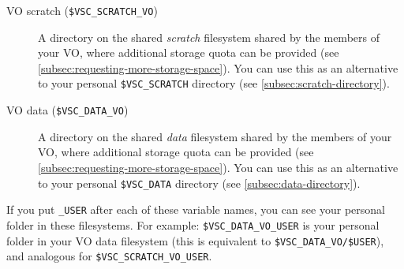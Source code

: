 \begin{description}
    \item[VO scratch (\texttt{\$VSC\_SCRATCH\_VO})]
        A directory on the shared \emph{scratch} filesystem shared by the members of your
        VO, where additional storage quota can be provided (see \autoref{subsec:requesting-more-storage-space}).
        You can use this as an alternative to your personal \lstinline|$VSC_SCRATCH|
        directory (see \autoref{subsec:scratch-directory}).

    \item[VO data (\texttt{\$VSC\_DATA\_VO})]
        A directory on the shared \emph{data} filesystem shared by the members of your
        VO, where additional storage quota can be provided (see \autoref{subsec:requesting-more-storage-space}).
        You can use this as an alternative to your personal \lstinline|$VSC_DATA|
        directory (see \autoref{subsec:data-directory}).

\end{description}

If you put \lstinline|_USER| after each of these variable names, you can see your
personal folder in these filesystems. For example: \lstinline|$VSC_DATA_VO_USER|
is your personal folder in your VO data filesystem (this is equivalent to
\lstinline|$VSC_DATA_VO/$USER|), and analogous for \lstinline|$VSC_SCRATCH_VO_USER|.

\fi

